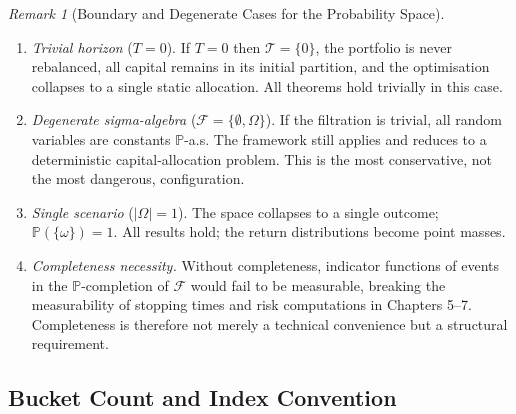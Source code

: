 \documentclass[12pt,openany]{book}
\newcommand{\calF}{\mathcal{F}}
\newcommand{\Prob}{\mathbb{P}}
\numberwithin{equation}{chapter}
\theoremstyle{plain}
\theoremstyle{definition}
\theoremstyle{remark}
\newtheorem{remark}[theorem]{Remark}
\numberwithin{equation}{chapter}
\theoremstyle{plain}
\begin{document}
\begin{remark}[Boundary and Degenerate Cases for the Probability Space]
\label{rem:prob-space-boundary}
\begin{enumerate}[label=\textbf{(R\arabic*)}]
  \item \emph{Trivial horizon} ($T = 0$).
        If $T = 0$ then $\mathcal{T} = \{0\}$, the portfolio is
        never rebalanced, all capital remains in its initial
        partition, and the optimisation collapses to a single
        static allocation.  All theorems hold trivially in this
        case.

  \item \emph{Degenerate sigma-algebra} ($\calF = \{\emptyset, \Omega\}$).
        If the filtration is trivial, all random variables are
        constants $\Prob$-a.s.  The framework still applies and
        reduces to a deterministic capital-allocation problem.
        This is the most conservative, not the most dangerous,
        configuration.

  \item \emph{Single scenario} ($|\Omega| = 1$).
        The space collapses to a single outcome; $\Prob(\{\omega\}) = 1$.
        All results hold; the return distributions become point masses.

  \item \emph{Completeness necessity.}
        Without completeness, indicator functions of events in the
        $\Prob$-completion of $\calF$ would fail to be measurable,
        breaking the measurability of stopping times and risk
        computations in Chapters 5--7.  Completeness is therefore not
        merely a technical convenience but a structural requirement.
\end{enumerate}
\end{remark}

\subsection{Bucket Count and Index Convention}
\end{document}
